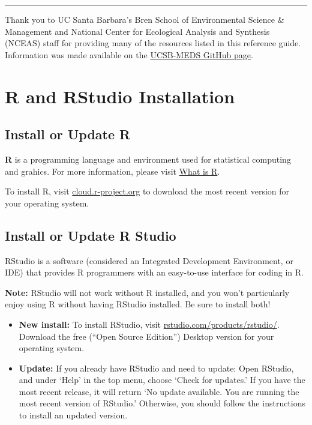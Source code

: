 \documentclass[
]{book}
\begin{document}
\begin{center}\rule{0.5\linewidth}{0.5pt}\end{center}

Thank you to UC Santa Barbara's Bren School of Environmental Science \& Management and National Center for Ecological Analysis and Synthesis (NCEAS) staff for providing many of the resources listed in this reference guide. Information was made available on the \href{https://github.com/UCSB-MEDS}{UCSB-MEDS GitHub page}.

\hypertarget{r}{%
\chapter{R and RStudio Installation}\label{r}}

\hypertarget{install-or-update-r}{%
\section{Install or Update R}\label{install-or-update-r}}

\textbf{R} is a programming language and environment used for statistical computing and grahics. For more information, please visit \href{https://www.r-project.org/about.html}{What is R}.

To install R, visit \href{https://cloud.r-project.org/}{cloud.r-project.org} to download the most recent version for your operating system.

\hypertarget{install-or-update-r-studio}{%
\section{Install or Update R Studio}\label{install-or-update-r-studio}}

RStudio is a software (considered an Integrated Development Environment, or IDE) that provides R programmers with an easy-to-use interface for coding in R.

\textbf{Note:} RStudio will not work without R installed, and you won't particularly enjoy using R without having RStudio installed. Be sure to install both!

\begin{itemize}
\item
  \textbf{New install:} To install RStudio, visit \href{https://www.rstudio.com/products/rstudio/}{rstudio.com/products/rstudio/}. Download the free (``Open Source Edition'') Desktop version for your operating system.
\item
  \textbf{Update:} If you already have RStudio and need to update: Open RStudio, and under `Help' in the top menu, choose `Check for updates.' If you have the most recent release, it will return `No update available. You are running the most recent version of RStudio.' Otherwise, you should follow the instructions to install an updated version.
\end{itemize}
\end{document}
